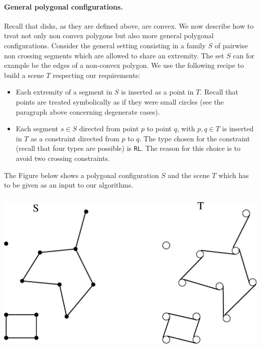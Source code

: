 \paragraph{General polygonal configurations. } Recall that disks, as they are defined
above, are convex. We now describe how to treat not only non convex polygons but
also more general polygonal configurations. Consider the general setting consisting in a 
family $S$ of pairwise non crossing segments which are allowed to share an
extremity. The set $S$ can for example be the edges of a non-convex polygon.
We use the following recipe to build a scene $T$ respecting our requirements:
\begin{itemize}
    \item Each extremity of a segment in $S$ is inserted as a point in $T$.
    Recall that points are treated symbolically as if they were small circles
    (see the paragraph above concerning degenerate cases). 
    \item Each segment $s \in S$ directed from point $p$ to point $q$, with $p,q
    \in T$ is inserted in $T$ as a constraint directed from $p$ to $q$. The type
    chosen for the constraint (recall that four types are possible) is
    \texttt{RL}. The reason for this choice is to avoid two crossing constraints.
\end{itemize}

The Figure below shows a polygonal configuration $S$ and the scene $T$ which
has to be given as an input to our algorithms. 

\begin{ccTexOnly}
    \begin{center}
        \includegraphics[height=8cm]{fig/configuration.eps}%
    \end{center}
\end{ccTexOnly}

